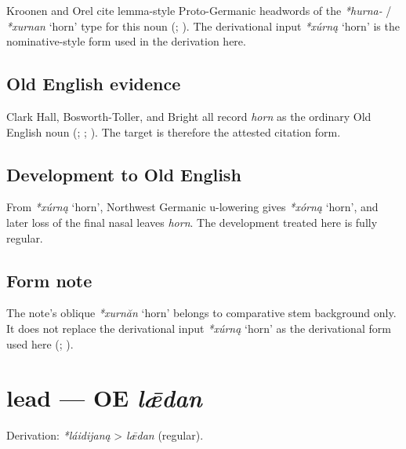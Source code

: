 \documentclass[
  british,
  a4paper,
  openany]{book}
\providecommand{\Recon}[1]{\emph{*#1}}
{\catcode`→=\active \global\def→{\ensuremath{\rightarrow}}}
\providecommand{\texorpdfstring}[2]{#1}
\providecommand{\Recon}[1]{\emph{*#1}}
{\catcode`→=\active \global\def→{\ensuremath{\rightarrow}}}
\begin{document}
Kroonen and Orel cite lemma-style Proto-Germanic headwords of the
\emph{*hurna-} / \Recon{xurnan} `horn' type for this noun
(; ). The derivational input \Recon{xúrną} `horn' is the
nominative-style form used in the derivation here.

\subsection{Old English evidence}\label{old-english-evidence-32}

Clark Hall, Bosworth-Toller, and Bright all record \emph{horn} as the
ordinary Old English noun (; ;
). The target is
therefore the attested citation form.

\subsection{Development to Old
English}\label{development-to-old-english-32}

From \Recon{xúrną} `horn', Northwest Germanic u-lowering gives
\Recon{xórną} `horn', and later loss of the final nasal leaves
\emph{horn}. The development treated here is fully regular.

\subsection{Form note}\label{form-note-10}

The note's oblique \Recon{xurnăn} `horn' belongs to comparative stem
background only. It does not replace the derivational input
\Recon{xúrną} `horn' as the derivational form used here
(; ).

\section{\texorpdfstring{lead --- OE
\emph{lǣdan}}{lead --- OE lǣdan}}\label{lead-oe-lux1e3dan}


Derivation: \emph{*láidijaną} \textgreater{} \emph{lǣdan} (regular).
\end{document}
